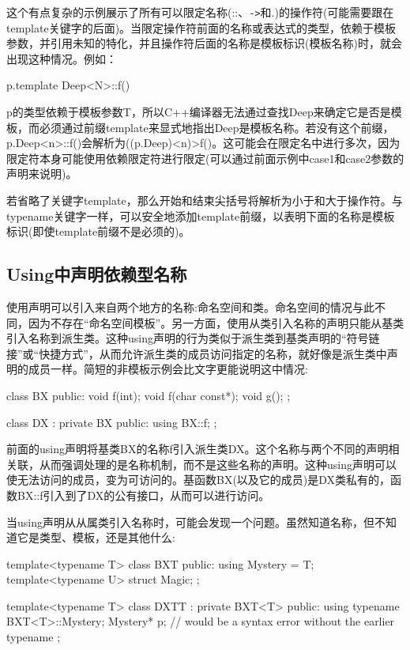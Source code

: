 这个有点复杂的示例展示了所有可以限定名称(::、\texttt{->}和.)的操作符(可能需要跟在template关键字的后面)。当限定操作符前面的名称或表达式的类型，依赖于模板参数，并引用未知的特化，并且操作符后面的名称是模板标识(模板名称)时，就会出现这种情况。例如：

\begin{cpp}
p.template Deep<N>::f()
\end{cpp}

p的类型依赖于模板参数T，所以C++编译器无法通过查找Deep来确定它是否是模板，而必须通过前缀template来显式地指出Deep是模板名称。若没有这个前缀，p.Deep<n>::f()会解析为((p.Deep)<n)>f()。这可能会在限定名中进行多次，因为限定符本身可能使用依赖限定符进行限定(可以通过前面示例中case1和case2参数的声明来说明)。

若省略了关键字template，那么开始和结束尖括号将解析为小于和大于操作符。与typename关键字一样，可以安全地添加template前缀，以表明下面的名称是模板标识(即使template前缀不是必须的)。

\subsection{Using中声明依赖型名称}

使用声明可以引入来自两个地方的名称:命名空间和类。命名空间的情况与此不同，因为不存在“命名空间模板”。另一方面，使用从类引入名称的声明只能从基类引入名称到派生类。这种using声明的行为类似于派生类到基类声明的“符号链接”或“快捷方式”，从而允许派生类的成员访问指定的名称，就好像是派生类中声明的成员一样。简短的非模板示例会比文字更能说明这中情况:

\begin{cpp}
class BX {
	public:
	void f(int);
	void f(char const*);
	void g();
};

class DX : private BX {
	public:
	using BX::f;
};
\end{cpp}

前面的using声明将基类BX的名称f引入派生类DX。这个名称与两个不同的声明相关联，从而强调处理的是名称机制，而不是这些名称的声明。这种using声明可以使无法访问的成员，变为可访问的。基函数BX(以及它的成员)是DX类私有的，函数BX::f引入到了DX的公有接口，从而可以进行访问。

当using声明从从属类引入名称时，可能会发现一个问题。虽然知道名称，但不知道它是类型、模板，还是其他什么:

\begin{cpp}
template<typename T>
class BXT {
	public:
	using Mystery = T;
	template<typename U>
	struct Magic;
};

template<typename T>
class DXTT : private BXT<T> {
	public:
	using typename BXT<T>::Mystery;
	Mystery* p; // would be a syntax error without the earlier typename
};
\end{cpp}

